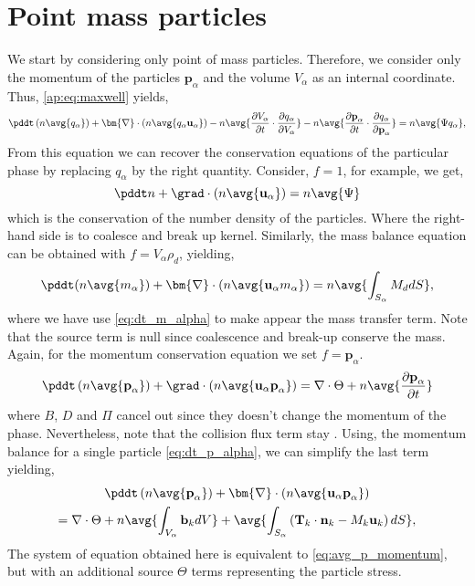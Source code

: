 \section{Point mass particles}
We start by considering only point of mass particles. 
Therefore, we consider only the momentum of the particles $\textbf{p}_\alpha$ and the volume $V_\alpha$ as an internal coordinate.
Thus, \ref{ap:eq:maxwell} yields,
\begin{equation}
    \pddt \left( n \avg{q_\alpha}\right)
    + \bm{\nabla} \cdot \left(n \avg{q_\alpha \textbf{u}_\alpha}\right)
    - n  \avg{\frac{\partial V_\alpha}{\partial t} \cdot \frac{\partial q_\alpha}{\partial V_\alpha}}
    - n  \avg{\frac{\partial \textbf{p}_\alpha}{\partial t} \cdot \frac{\partial q_\alpha}{\partial \textbf{p}_\alpha}}
    = n \avg{\Psi q_\alpha},
\end{equation}
From this equation we can recover the conservation equations of the particular phase by replacing $q_\alpha$ by the right quantity. 
Consider, $f = 1$, for example, we get, 
\begin{equation}
    \pddt n
    + \grad \cdot \left(n \avg{\textbf{u}_\alpha}\right)
    = n\avg{\Psi}
\end{equation}
which is the conservation of the number density of the particles. 
Where the right-hand side is to coalesce and break up kernel.
Similarly, the mass balance equation can be obtained with $f = V_\alpha \rho_d$, yielding,
\begin{equation}
    \pddt (n\avg{m_\alpha})
    + \bm{\nabla} \cdot \left(n \avg{\textbf{u}_\alpha m_\alpha}\right)
    =
    n  \avg{\int_{S_\alpha} M_d dS},
\end{equation}
where we have use \ref{eq:dt_m_alpha} to make appear the mass transfer term. 
Note that the source term is null since coalescence and break-up conserve the mass. 
Again, for the momentum conservation equation we set $f = \textbf{p}_\alpha$.
\begin{equation}
    \pddt \left( n \avg{\textbf{p}_\alpha}\right)
    + \grad \cdot \left(n \avg{\textbf{u}_\alpha \textbf{p}_\alpha}\right)
    =  \nabla \cdot \Theta
    + n  \avg{\frac{\partial \textbf{p}_\alpha}{\partial t}}
\end{equation}
where $B$, $D$ and $\Pi$ cancel out since they doesn't change the momentum of the phase. 
Nevertheless, note that the collision flux term stay \citep{rao2008introduction}.
Using, the momentum balance for a single particle \ref{eq:dt_p_alpha}, we can simplify the last term yielding, 
\begin{multline*}
    \pddt \left( n \avg{\textbf{p}_\alpha}\right)
    + \bm{\nabla} \cdot \left(n \avg{\textbf{u}_\alpha \textbf{p}_\alpha }\right)\\
    = 
    \nabla \cdot \Theta
    + n\avg{\int_{V_\alpha} \textbf{b}_k dV}
    + \avg{\int_{S_\alpha} \left(
    \textbf{T}_k\cdot\textbf{n}_k
    - M_k \textbf{u}_k
    \right)dS},
\end{multline*}
The system of equation obtained here is equivalent to \ref{eq:avg_p_momentum}, but with an additional source $\Theta$ terms representing the particle stress.

